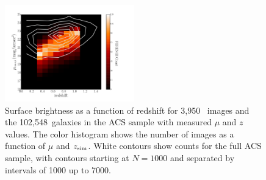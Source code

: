 \documentclass[twocolumn]{aastex6}
\begin{document}
\begin{figure}
\begin{center}
\includegraphics[width=0.5\textwidth]{figures/eye_of_sauron.pdf}
\caption{Surface brightness as a function of redshift for 3,950~\ferengi{} images and the 102,548~galaxies in the ACS sample with measured $\mu$ and $z$ values. The color histogram shows the number of \ferengi{} images as a function of $\mu$ and $z_{\rm sim}$. White contours show counts for the full ACS sample, with contours starting at $N=1000$ and separated by intervals of 1000 up to 7000.} 
\label{fig:sb_redshift}
\end{center}
\end{figure}
\end{document}

